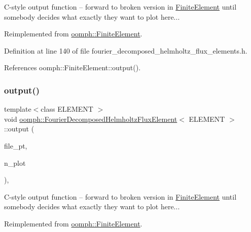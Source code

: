 C-\/style output function -- forward to broken version in \hyperlink{classoomph_1_1FiniteElement}{Finite\+Element} until somebody decides what exactly they want to plot here... 

Reimplemented from \hyperlink{classoomph_1_1FiniteElement_a72cddd09f8ddbee1a20a1ff404c6943e}{oomph\+::\+Finite\+Element}.



Definition at line 140 of file fourier\+\_\+decomposed\+\_\+helmholtz\+\_\+flux\+\_\+elements.\+h.



References oomph\+::\+Finite\+Element\+::output().

\mbox{\label{classoomph_1_1FourierDecomposedHelmholtzFluxElement_ad09e029959ddf65ad88f2b3fbbddaa03}} 
\subsubsection{\texorpdfstring{output()}{output()}\hspace{0.1cm}{\footnotesize\ttfamily [4/4]}}
{\footnotesize\ttfamily template$<$class E\+L\+E\+M\+E\+NT $>$ \\
void \hyperlink{classoomph_1_1FourierDecomposedHelmholtzFluxElement}{oomph\+::\+Fourier\+Decomposed\+Helmholtz\+Flux\+Element}$<$ E\+L\+E\+M\+E\+NT $>$\+::output (\begin{DoxyParamCaption}\item[{F\+I\+LE $\ast$}]{file\+\_\+pt,  }\item[{const unsigned \&}]{n\+\_\+plot }\end{DoxyParamCaption})\hspace{0.3cm}{\ttfamily [inline]}, {\ttfamily [virtual]}}



C-\/style output function -- forward to broken version in \hyperlink{classoomph_1_1FiniteElement}{Finite\+Element} until somebody decides what exactly they want to plot here... 



Reimplemented from \hyperlink{classoomph_1_1FiniteElement_adfaee690bb0608f03320eeb9d110d48c}{oomph\+::\+Finite\+Element}.




